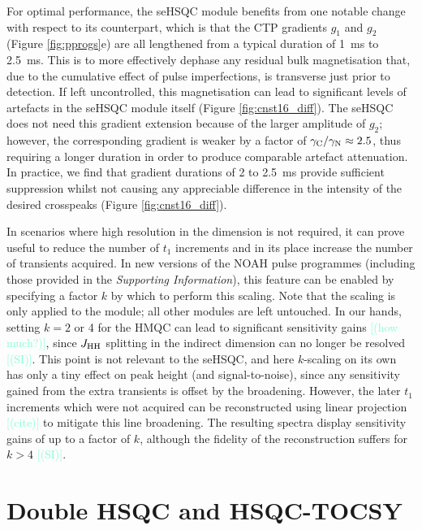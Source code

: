 \documentclass[11pt]{article}
\newcommand*{\carbon}{\ce{^{13}C}}
\newcommand*{\nitrogen}{\ce{^{15}N}}
\newcommand*{\hl}[1]{\textcolor{Aquamarine}{[#1]}}
\newcommand*{\jhh}{J_{\ce{HH}}}
\newcommand*{\figref}[1]{Figure \ref{fig:#1}}
\newcommand*{\SInf}{\textit{Supporting Information}}
\newcommand*{\sitodo}{\hl{(SI)}}
\begin{document}
For optimal performance, the \nitrogen{} seHSQC module benefits from one notable change with respect to its \carbon{} counterpart, which is that the CTP gradients $g_1$ and $g_2$ (\figref{pprogs}e) are all lengthened from a typical duration of \SI{1}{\ms} to \SI{2.5}{\ms}.
This is to more effectively dephase any residual bulk magnetisation that, due to the cumulative effect of pulse imperfections, is transverse just prior to detection.
If left uncontrolled, this magnetisation can lead to significant levels of artefacts in the seHSQC module itself (\figref{cnst16_diff}).
The \carbon{} seHSQC does not need this gradient extension because of the larger amplitude of $g_2$; however, the corresponding \nitrogen{} gradient is weaker by a factor of $\gamma_{\ce{C}}/\gamma_{\ce{N}} \approx 2.5$, thus requiring a longer duration in order to produce comparable artefact attenuation.
In practice, we find that gradient durations of 2 to \SI{2.5}{\ms} provide sufficient suppression whilst not causing any appreciable difference in the intensity of the desired crosspeaks (\figref{cnst16_diff}).

In scenarios where high resolution in the \nitrogen{} dimension is not required, it can prove useful to reduce the number of $t_1$ increments and in its place increase the number of transients acquired.\autocite{Perez-Trujillo2007MRC, Parella2010CMR}
In new versions of the NOAH pulse programmes (including those provided in the \SInf{}), this feature can be enabled by specifying a factor $k$ by which to perform this scaling.
Note that the scaling is only applied to the \nitrogen{} module; all other modules are left untouched.
In our hands, setting $k = 2$ or 4 for the \nitrogen{} HMQC can lead to significant sensitivity gains \hl{(how much?)}, since $\jhh$ splitting in the indirect dimension can no longer be resolved \sitodo{}.
This point is not relevant to the seHSQC, and here $k$-scaling on its own has only a tiny effect on peak height (and signal-to-noise), since any sensitivity gained from the extra transients is offset by the broadening.
However, the later $t_1$ increments which were not acquired can be reconstructed using linear projection \hl{(cite)} to mitigate this line broadening.
The resulting spectra display sensitivity gains of up to a factor of $k$, although the fidelity of the reconstruction suffers for $k > 4$ \sitodo.

\section*{Double HSQC and HSQC-TOCSY}
\end{document}
